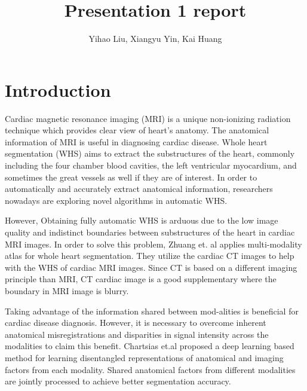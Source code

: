 \documentclass[10pt,sigconf,letterpaper,nonacm]{acmart}
\begin{document}

\thispagestyle{empty}

\title{Presentation 1 report}
\author{Yihao Liu, Xiangyu Yin, Kai Huang}
\date{}
\maketitle

\section{Introduction}
Cardiac magnetic resonance imaging (MRI) is a unique non-ionizing radiation technique which provides clear view of heart’s anatomy. The anatomical information of MRI is useful in diagnosing cardiac disease. Whole heart segmentation (WHS) aims to extract the substructures of the heart, commonly including the four chamber blood cavities, the left ventricular myocardium, and sometimes the great vessels as well if they are of interest\cite{zheng2008four}. In order to automatically and accurately extract anatomical information, researchers nowadays are exploring novel algorithms in automatic WHS. 

However, Obtaining fully automatic WHS is arduous due to the low image quality and indistinct boundaries between substructures of the heart in cardiac MRI images. In order to solve this problem, Zhuang et. al\cite{zhuang2016multi} applies multi-modality atlas for whole heart segmentation. They utilize the cardiac CT images to help with the WHS of cardiac MRI images. Since CT is based on a different imaging principle than MRI, CT cardiac image is a good supplementary where the boundary in MRI image is blurry.

Taking advantage of the information shared between mod-alities is beneficial for cardiac disease diagnosis. However, it is necessary to overcome inherent anatomical misregistrations and disparities in signal intensity across the modalities to claim this benefit. Chartsias et.al\cite{chartsias2019multi} proposed a deep learning based method for learning disentangled representations of anatomical and imaging factors from each modality. Shared anatomical factors from different modalities are jointly processed to achieve better segmentation accuracy.
\end{document}
